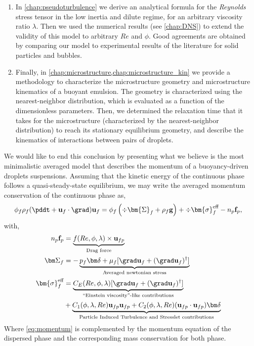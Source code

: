 \begin{enumerate}
    \item In \ref{chap:pseudoturbulence} we derive an analytical formula for the \textit{Reynolds} stress tensor in the low inertia and dilute regime, for an arbitrary viscosity ratio $\lambda$. 
    Then we used the numerical results (see \ref{chap:DNS}) to extend the validity of this model to arbitrary $Re$ and $\phi$. 
    Good agreements are obtained by comparing our model to experimental results of the literature for solid particles and bubbles.  
    \item Finally, in \ref{chap:microstructure,chap:microstructure_kin} we provide a methodology to characterize the microstructure geometry and microstructure kinematics of a buoyant emulsion. 
    The geometry is characterized using the nearest-neighbor distribution, which is evaluated as a function of the dimensionless parameters. 
    Then, we determined the relaxation time that it takes for the microstructure (characterized by the nearest-neighbor distribution) to reach its stationary equilibrium geometry, and describe the kinematics of interactions between pairs of droplets. 
\end{enumerate}

We would like to end this conclusion by presenting what we believe is the most minimalistic averaged model that describes the momentum of a buoyancy-driven droplets suspensions. 
Assuming that the kinetic energy of the continuous phase follows a quasi-steady-state equilibrium, we may write the averaged momentum conservation of the continuous phase as, 
\begin{align}
    \phi_f\rho_f (\pddt + \textbf{u}_f\cdot \grad)\textbf{u}_f
    = \phi_f 
    \left(\div \bm{\Sigma}_f
    + \rho_f \textbf{g}\right)
    + \div  \bm{\sigma}_f^{\text{eff}}
    - n_p \textbf{f}_p,
    \label{eq:momentum}
\end{align}
with, 
\begin{align}
    n_p \textbf{f}_p  
    &= 
    \underbrace{f(Re,\phi, \lambda) \times \textbf{u}_{fp}}_\text{Drag force}
    \label{eq:draggggg}
    \\
    \label{eq:newtonian}
  \bm\Sigma_f &= - \underbrace{p_f \bm\delta + \mu_f [\grad \textbf{u}_f +  (\grad \textbf{u}_f)^\dagger ]}_\text{Averaged newtonian stress} 
  \\
    \bm{\sigma}^{\text{eff}}_f 
    &= \underbrace{ C_E(Re,\phi,\lambda)  [\grad \textbf{u}_f +  (\grad \textbf{u}_f)^\dagger ] }_\text{``Einstein viscosity''-like contributions}
    \nonumber\\
    &+ 
    \underbrace{
      C_1(\phi,\lambda,Re)\textbf{u}_{fp}\textbf{u}_{fp}
      +  C_2(\phi,\lambda,Re)(\textbf{u}_{fp}\cdot \textbf{u}_{fp})     \bm\delta}_\text{Particle Induced Turbulence and Stresslet contributions}
    \label{eq:stress}
\end{align}
Where \ref{eq:momentum} is complemented by the momentum equation of the dispersed phase and the corresponding mass conservation for both phase. 

